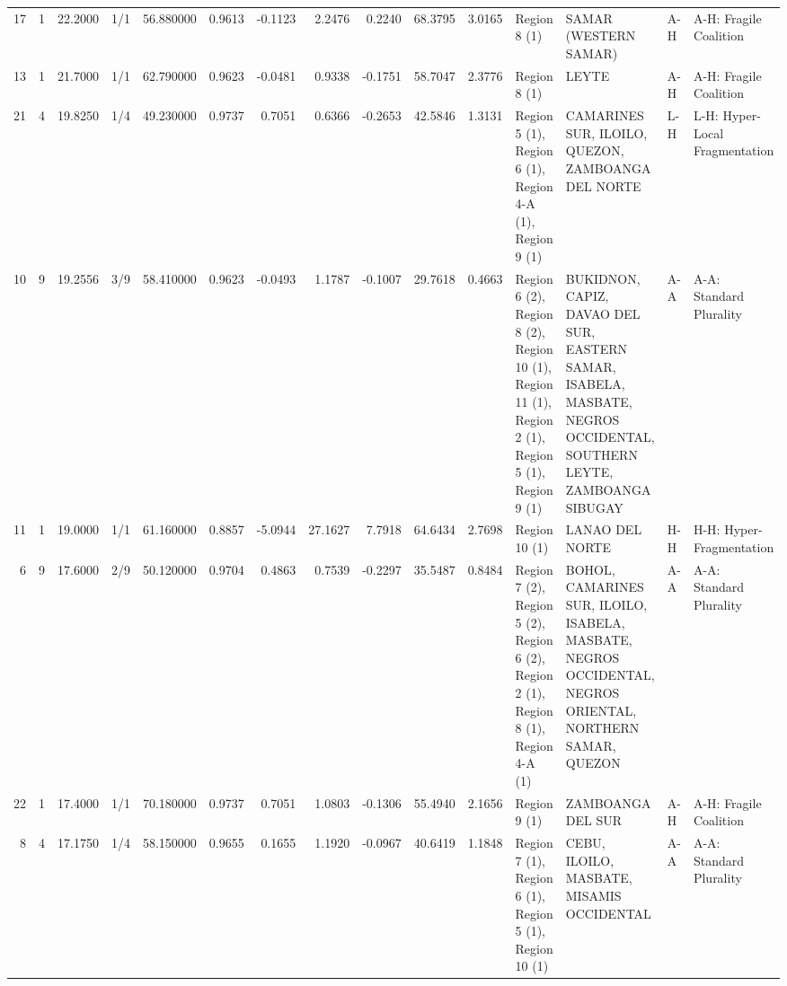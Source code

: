 \begin{tabular}{rrrlrrrrrrrllll}
17 & 1 & {\cellcolor[HTML]{82A6FB}} \color[HTML]{F1F1F1} 22.2000 & 1/1 & {\cellcolor[HTML]{D2DBE8}} \color[HTML]{000000} 56.880000 & 0.9613 & -0.1123 & 2.2476 & 0.2240 & 68.3795 & 3.0165 & Region 8 (1) & SAMAR (WESTERN SAMAR) & A-H & A-H: Fragile Coalition \\
13 & 1 & {\cellcolor[HTML]{80A3FA}} \color[HTML]{F1F1F1} 21.7000 & 1/1 & {\cellcolor[HTML]{F7AF91}} \color[HTML]{000000} 62.790000 & 0.9623 & -0.0481 & 0.9338 & -0.1751 & 58.7047 & 2.3776 & Region 8 (1) & LEYTE & A-H & A-H: Fragile Coalition \\
21 & 4 & {\cellcolor[HTML]{7699F6}} \color[HTML]{F1F1F1} 19.8250 & 1/4 & {\cellcolor[HTML]{6B8DF0}} \color[HTML]{F1F1F1} 49.230000 & 0.9737 & 0.7051 & 0.6366 & -0.2653 & 42.5846 & 1.3131 & Region 5 (1), Region 6 (1), Region 4-A (1), Region 9 (1) & CAMARINES SUR, ILOILO, QUEZON, ZAMBOANGA DEL NORTE & L-H & L-H: Hyper-Local Fragmentation \\
10 & 9 & {\cellcolor[HTML]{7396F5}} \color[HTML]{F1F1F1} 19.2556 & 3/9 & {\cellcolor[HTML]{E1DAD6}} \color[HTML]{000000} 58.410000 & 0.9623 & -0.0493 & 1.1787 & -0.1007 & 29.7618 & 0.4663 & Region 6 (2), Region 8 (2), Region 10 (1), Region 11 (1), Region 2 (1), Region 5 (1), Region 9 (1) & BUKIDNON, CAPIZ, DAVAO DEL SUR, EASTERN SAMAR, ISABELA, MASBATE, NEGROS OCCIDENTAL, SOUTHERN LEYTE, ZAMBOANGA SIBUGAY & A-A & A-A: Standard Plurality \\
11 & 1 & {\cellcolor[HTML]{7295F4}} \color[HTML]{F1F1F1} 19.0000 & 1/1 & {\cellcolor[HTML]{F5C4AC}} \color[HTML]{000000} 61.160000 & 0.8857 & -5.0944 & 27.1627 & 7.7918 & 64.6434 & 2.7698 & Region 10 (1) & LANAO DEL NORTE & H-H & H-H: Hyper-Fragmentation \\
6 & 9 & {\cellcolor[HTML]{6B8DF0}} \color[HTML]{F1F1F1} 17.6000 & 2/9 & {\cellcolor[HTML]{779AF7}} \color[HTML]{F1F1F1} 50.120000 & 0.9704 & 0.4863 & 0.7539 & -0.2297 & 35.5487 & 0.8484 & Region 7 (2), Region 5 (2), Region 6 (2), Region 2 (1), Region 8 (1), Region 4-A (1) & BOHOL, CAMARINES SUR, ILOILO, ISABELA, MASBATE, NEGROS OCCIDENTAL, NEGROS ORIENTAL, NORTHERN SAMAR, QUEZON & A-A & A-A: Standard Plurality \\
22 & 1 & {\cellcolor[HTML]{6A8BEF}} \color[HTML]{F1F1F1} 17.4000 & 1/1 & {\cellcolor[HTML]{B8122A}} \color[HTML]{F1F1F1} 70.180000 & 0.9737 & 0.7051 & 1.0803 & -0.1306 & 55.4940 & 2.1656 & Region 9 (1) & ZAMBOANGA DEL SUR & A-H & A-H: Fragile Coalition \\
8 & 4 & {\cellcolor[HTML]{688AEF}} \color[HTML]{F1F1F1} 17.1750 & 1/4 & {\cellcolor[HTML]{DFDBD9}} \color[HTML]{000000} 58.150000 & 0.9655 & 0.1655 & 1.1920 & -0.0967 & 40.6419 & 1.1848 & Region 7 (1), Region 6 (1), Region 5 (1), Region 10 (1) & CEBU, ILOILO, MASBATE, MISAMIS OCCIDENTAL & A-A & A-A: Standard Plurality \\

\end{tabular}
